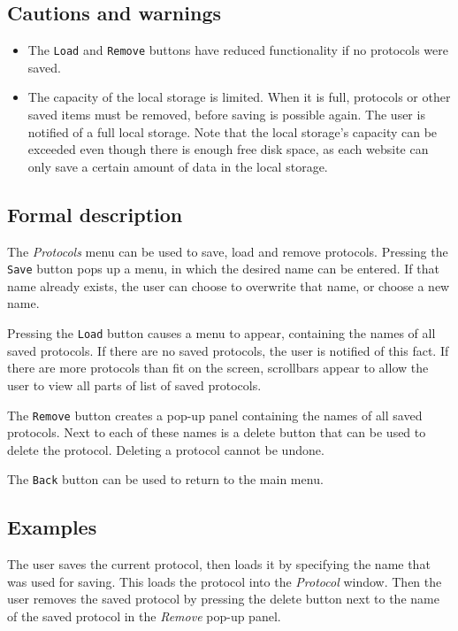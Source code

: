  \subsection*{Cautions and warnings}
  \begin{itemize}
    \item The \texttt{Load} and \texttt{Remove} buttons have reduced functionality if no protocols were saved.
    \item The capacity of the local storage is limited. When it is full, protocols or other saved \projectname{} items must be removed, before saving is possible again. The user is notified of a full local storage. Note that the local storage's capacity can be exceeded even though there is enough free disk space, as each website can only save a certain amount of data in the local storage.
  \end{itemize}  

  \subsection*{Formal description}
  The \emph{Protocols} menu can be used to save, load and remove protocols. Pressing the \texttt{Save} button pops up a menu, in which the desired name can be entered. If that name already exists, the user can choose to overwrite that name, or choose a new name.
  
  Pressing the \texttt{Load} button causes a menu to appear, containing the names of all saved protocols. If there are no saved protocols, the user is notified of this fact. If there are more protocols than fit on the screen, scrollbars appear to allow the user to view all parts of list of saved protocols.
  
  The \texttt{Remove} button creates a pop-up panel containing the names of all saved protocols. Next to each of these names is a delete button that can be used to delete the protocol. Deleting a protocol cannot be undone.
  
  The \texttt{Back} button can be used to return to the main menu.
  
  \subsection*{Examples}
  The user saves the current protocol, then loads it by specifying the name that was used for saving. This loads the protocol into the \emph{Protocol} window. Then the user removes the saved protocol by pressing the delete button next to the name of the saved protocol in the \emph{Remove} pop-up panel.

